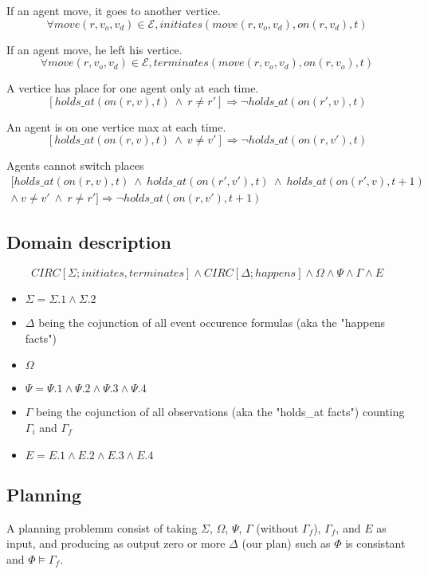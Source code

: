 If an agent move, it goes to another vertice.
\begin{equation}
  \tag{$\Sigma$.1}
  \forall move(r,v_o,v_d) \in \mathcal{E},initiates(move(r,v_o,v_d),on(r,v_d),t)
\end{equation}

If an agent move, he left his vertice.
\begin{equation}
  \tag{$\Sigma$.2}
  \forall move(r,v_o,v_d) \in \mathcal{E},terminates(move(r,v_o,v_d),on(r,v_o),t)
\end{equation}

A vertice has place for one agent only at each time.
\begin{equation}
  \tag{$\Psi$.2}
  [holds\_at(on(r,v),t)\ \land\ r\neq r']\Rightarrow \neg holds\_at(on(r',v),t)
\end{equation}

An agent is on one vertice max at each time.
\begin{equation}
  \tag{$\Psi$.3}
  [holds\_at(on(r,v),t)\ \land\ v\neq v']\Rightarrow \neg holds\_at(on(r,v'),t)
\end{equation}

Agents cannot switch places
\begin{multline}
  \tag{$\Psi$.4}
  [holds\_at(on(r,v),t)\ \land\ holds\_at(on(r',v'),t)\ \land\ holds\_at(on(r',v),t+1) \\ \land\ v\neq v'\ \land\ r\neq r'] \Rightarrow \neg holds\_at(on(r,v'),t+1)
\end{multline}

\subsection{Domain description}
\begin{equation}
  \tag{$\Phi$}
  CIRC[\Sigma;initiates,terminates] \land CIRC[\Delta;happens] \land \Omega \land \Psi \land \Gamma \land E
\end{equation}
\begin{itemize}
  \item $\Sigma = \Sigma.1 \land \Sigma.2$
  \item $\Delta$ being the cojunction of all event occurence formulas (aka the "happens facts")
  \item $\Omega$
  \item $\Psi = \Psi .1 \land \Psi .2 \land \Psi .3 \land \Psi .4$
  \item $\Gamma$ being the cojunction of all observations (aka the "holds\_at facts") counting $\Gamma_i$ and $\Gamma_f$
  \item $E = E.1 \land E.2 \land E.3 \land E.4$
\end{itemize}

\subsection{Planning}

A planning problemm consist of taking $\Sigma$, $\Omega$, $\Psi$, $\Gamma$ (without $\Gamma_f$), $\Gamma_f$, and $E$ as input,
and producing as output zero or more $\Delta$ (our plan) such as $\Phi$ is consistant and $\Phi\models\Gamma_f$.
